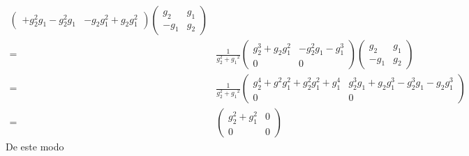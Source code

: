 \begin{frame}
\begin{align}
\begin{pmatrix}
+g_2^2{g_1}-g_2^2{g_1}    &-g_2 g_1^2+g_2 g_1^2
  \end{pmatrix}
\begin{pmatrix}
    g_2   & {g_1}\\
    -{g_1} & g_2
  \end{pmatrix}\nonumber\\
=&\frac{1}{g_2^2+{{g_1}}^2}
  \begin{pmatrix}
    g_2^3+g_2 g_1^2 & -g_2^2{g_1}-g_1^3\\
    0   &0
  \end{pmatrix}
\begin{pmatrix}
    g_2   & {g_1}\\
    -{g_1} & g_2
  \end{pmatrix}\nonumber\\
=&\frac{1}{g_2^2+{{g_1}}^2}
  \begin{pmatrix}
    g_2^4+g^2 g_1^2+g_2^2 g_1^2+g_1^4 & g_2^3{g_1}+g_2 g_1^3-g_2^3{g_1}-g_2 g_1^3\\
    0    &0
  \end{pmatrix}\nonumber\\
=&\begin{pmatrix}
    g_2^2+g_1^2 & 0\\
    0    &0
  \end{pmatrix}
\end{align}
De este modo


\end{frame}
